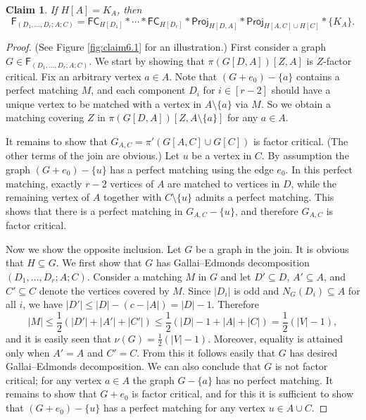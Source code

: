 \documentclass[10pt]{amsart}
\newtheorem{claim}[thm]{Claim}
\theoremstyle{definition}
\begin{document}
	\begin{claim}\label{fc join}
		If $H[A] = K_A$, then
		\[\mathsf{F}_{(D_1, \dots, D_r; A; C)} = 
		\mathsf{FC}_{H[D_1]} * \cdots * \mathsf{FC}_{H[D_r]} * 
		\mathsf{Proj}_{H[D,A]} * 
		\mathsf{Proj}_{H[A,C]\cup H[C]} * 
		\{ K_A \}.\]
	\end{claim}\textbf{}
	\begin{proof}
		(See Figure \ref{fig:claim6.1} for an illustration.) First consider a graph $G\in \mathsf{F}_{(D_1, \dots, D_r; A; C)}$. We start by showing that $\pi(G[D,A])[Z,A]$ is $Z$-factor critical. Fix an arbitrary vertex $a\in A$. Note that $(G+e_0)-\{a\}$ contains a perfect matching $M$, and each component $D_i$ for $i\in [r-2]$ should have a unique vertex to be matched with a vertex in $A\setminus \{a\}$ via $M$. So we obtain a matching covering $Z$ in $\pi(G[D,A])[Z,A\setminus \{a\}]$ for any $a\in A$. 
		
		
		It remains to show that $G_{A,C} = \pi'(G[A,C] \cup G[C])$ is factor critical. (The other terms of the join are obvious.) Let $u$ be a vertex in $C$. By assumption the graph $(G+e_0)-\{u\}$ has a perfect matching using the edge $e_0$. In this perfect matching, exactly $r-2$ vertices of $A$ are matched to vertices in $D$, while the remaining vertex of $A$ together with $C\setminus\{u\}$ admits a perfect matching. This shows that there is a perfect matching in $G_{A,C} - \{u\}$, and therefore $G_{A,C}$ is factor critical.
		
		Now we show the opposite inclusion. Let $G$ be a graph in the join. It is obvious that $H\subseteq G$. We first show that $G$ has Gallai--Edmonds decomposition $(D_1, \dots, D_r; A; C)$. Consider a matching $M$ in $G$ and let $D'\subseteq D$, $A'\subseteq A$, and $C'\subseteq C$ denote the vertices covered by $M$. Since $|D_i|$ is odd and $N_G(D_i) \subseteq A$ for all $i$, we have $|D'|\leq |D|- (c-|A|) = |D|-1$. Therefore
		\[|M| \leq
		\textstyle{\frac{1}{2}}(|D'| + |A'|+ |C'|) \leq
		\textstyle{\frac{1}{2}}(|D|-1 + |A|+ |C|) = \textstyle{\frac{1}{2}}(|V|-1),\]
		and it is easily seen that $\nu(G) = \frac{1}{2}(|V|-1)$. Moreover, equality is attained only when $A' =A$ and $C' = C$. From this it follows easily that $G$ has desired Gallai--Edmonds decomposition. We can also conclude that $G$ is not factor critical; for any vertex $a\in A$ the graph $G-\{a\}$ has no perfect matching. It remains to show that $G+e_0$ is factor critical, and for this it is sufficient to show that $(G+e_0)-\{u\}$ has a perfect matching for any vertex $u\in A\cup C$. 
		

\end{proof}
\end{document}
